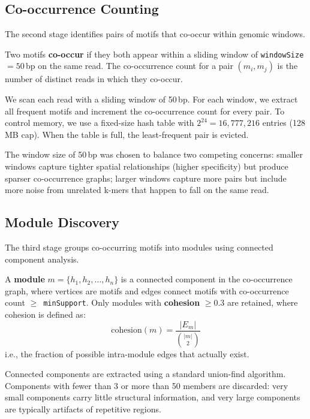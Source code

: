 \documentclass{../yalumba}
\begin{document}
\subsection{Co-occurrence Counting}

The second stage identifies pairs of motifs that co-occur within genomic
windows.

\begin{definition}
Two motifs \textbf{co-occur} if they both appear within a sliding window of
\texttt{windowSize} $= 50$\,bp on the same read.  The co-occurrence count for
a pair $(m_i, m_j)$ is the number of distinct reads in which they co-occur.
\end{definition}

\noindent We scan each read with a sliding window of 50\,bp.  For each
window, we extract all frequent motifs and increment the co-occurrence count
for every pair.  To control memory, we use a fixed-size hash table with
$2^{24} = 16{,}777{,}216$ entries (128\,MB cap).  When the table is full, the
least-frequent pair is evicted.

The window size of 50\,bp was chosen to balance two competing concerns:
smaller windows capture tighter spatial relationships (higher specificity) but
produce sparser co-occurrence graphs; larger windows capture more pairs but
include more noise from unrelated k-mers that happen to fall on the same read.

\subsection{Module Discovery}

The third stage groups co-occurring motifs into modules using connected
component analysis.

\begin{definition}
A \textbf{module} $m = \{h_1, h_2, \ldots, h_n\}$ is a connected component
in the co-occurrence graph, where vertices are motifs and edges connect motifs
with co-occurrence count $\geq$~\texttt{minSupport}.  Only modules with
\textbf{cohesion} $\geq 0.3$ are retained, where cohesion is defined as:
\begin{equation}
  \text{cohesion}(m) = \frac{|E_m|}{\binom{|m|}{2}}
  \label{eq:cohesion}
\end{equation}
i.e., the fraction of possible intra-module edges that actually exist.
\end{definition}

Connected components are extracted using a standard union-find algorithm.
Components with fewer than 3 or more than 50 members are discarded: very small
components carry little structural information, and very large components are
typically artifacts of repetitive regions.
\end{document}
